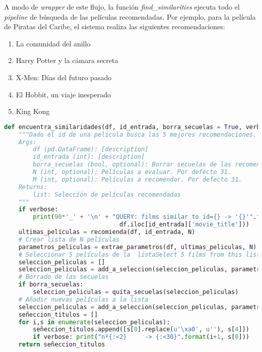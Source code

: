 A modo de \textit{wrapper} de este flujo, la función \textit{find\_similarities} ejecuta todo el \textit{pipeline} de búsqueda de las películas recomendadas. Por ejemplo, para la película de Piratas del Caribe, el sistema realiza las siguientes recomendaciones:

\begin{enumerate}
    \item La comunidad del anillo
    \item Harry Potter y la cámara secreta
    \item X-Men: Días del futuro pasado
    \item El Hobbit, un viaje inesperado
    \item King Kong
\end{enumerate}

\begin{lstlisting}[language=Python, caption={Wrapper del pipeline de búsqueda de recomendaciones. Se trata de la función final, es decir, la que llama a todas las demás para encontrar las películas recomendadas. Parte de un ID de película y busca las similares en términos de keywords, géneros, etc., las ordena por la heurística definida y devuelve las seleccionadas}]
def encuentra_similaridades(df, id_entrada, borra_secuelas = True, verbose = False, N = 31):
    """Dado el id de una película busca las 5 mejores recomendaciones.
    Args:
        df (pd.DataFrame): [description]
        id_entrada (int): [description]
        borra_secuelas (bool, optional): Borrar secuelas de las recomendaciones. Por defecto True.
        N (int, optional): Películas a evaluar. Por defecto 31.
        M (int, optional): Películas a recomendar. Por defecto 31.
    Returns:
        list: Selección de películas recomendadas
    """
    if verbose: 
        print(90*'_' + '\n' + "QUERY: films similar to id={} -> '{}'".format(id_entrada,
                                df.iloc[id_entrada]['movie_title']))
    ultimas_peliculas = recomienda(df, id_entrada, N)
    # Crear lista de N películas
    parametros_peliculas = extrae_parametros(df, ultimas_peliculas, N)
    # Seleccionar 5 películas de la  listaSelect 5 films from this list
    seleccion_peliculas = []
    seleccion_peliculas = add_a_seleccion(seleccion_peliculas, parametros_peliculas, N)
    # Borrado de las secuelas
    if borra_secuelas: 
        seleccion_peliculas = quita_secuelas(seleccion_peliculas)
    # Añadir nuevas películas a la lista
    seleccion_peliculas = add_a_seleccion(seleccion_peliculas, parametros_peliculas, N)
    señeccion_titulos = []
    for i,s in enumerate(seleccion_peliculas):
        señeccion_titulos.append([s[0].replace(u'\xa0', u''), s[4]])
        if verbose: print("nº{:<2}     -> {:<30}".format(i+1, s[0]))
    return señeccion_titulos
\end{lstlisting}

